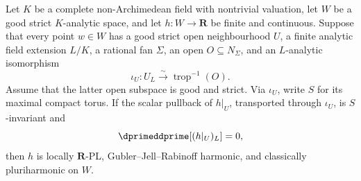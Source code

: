 
\begin{corollary}
\label{cor:p062-local-finite-split-invariant-scalar-stable-zero-current}
Let \(K\) be a complete non-Archimedean field with nontrivial valuation,
let \(W\) be a good strict \(K\)-analytic space, and let
\(h:W\to\mathbf R\) be finite and continuous.  Suppose that every point
\(w\in W\) has a good strict open neighbourhood \(U\), a finite analytic
field extension \(L/K\), a rational fan \(\Sigma\), an open
\(O\subseteq N_\Sigma\), and an \(L\)-analytic isomorphism
\[
            \iota_U:U_L\xrightarrow{\sim}\operatorname{trop}^{-1}(O).
\]
Assume that the latter open subspace is good and strict.  Via \(\iota_U\),
write \(S\) for its maximal compact torus.  If the scalar pullback of
\(h|_U\), transported through \(\iota_U\), is \(S\)-invariant and
\[
                     \dprimeddprime[(h|_U)_L]=0,
\]
then \(h\) is locally \(\mathbf R\)-PL, Gubler--Jell--Rabinoff harmonic,
and classically pluriharmonic on \(W\).
\end{corollary}
